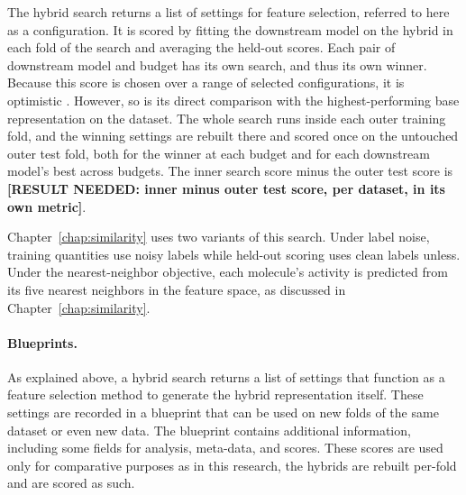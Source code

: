 The hybrid search returns a list of settings for feature selection, referred to here as a configuration. It is scored by fitting the downstream model on the hybrid in each fold of the search and averaging the held-out scores. Each pair of downstream model and budget has its own search, and thus its own winner. Because this score is chosen over a range of selected configurations, it is optimistic \citep{Varma2006, Cawley2010}. However, so is its direct comparison with the highest-performing base representation on the dataset. The whole search runs inside each outer training fold, and the winning settings are rebuilt there and scored once on the untouched outer test fold, both for the winner at each budget and for each downstream model's best across budgets. The inner search score minus the outer test score is \textbf{[RESULT NEEDED: inner minus outer test score, per dataset, in its own metric]}.

Chapter~\ref{chap:similarity} uses two variants of this search. Under label noise, training quantities use noisy labels while held-out scoring uses clean labels unless. Under the nearest-neighbor objective, each molecule's activity is predicted from its five nearest neighbors in the feature space, as discussed in Chapter~\ref{chap:similarity}.


\paragraph{Blueprints.}

As explained above, a hybrid search returns a list of settings that function as a feature selection method to generate the hybrid representation itself. These settings are recorded in a blueprint that can be used on new folds of the same dataset or even new data. The blueprint contains additional information, including some fields for analysis, meta-data, and scores. These scores are used only for comparative purposes as in this research, the hybrids are rebuilt per-fold and are scored as such. 


